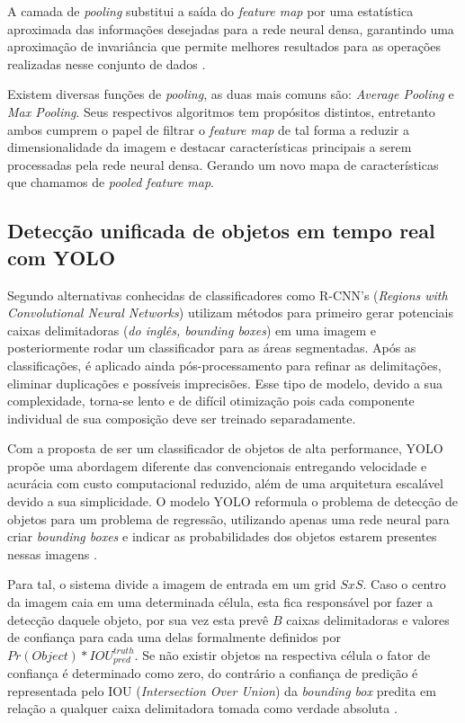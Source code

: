 \documentclass[12pt]{article}
\begin{document}
A camada de {\it pooling} substitui a saída do {\it feature map} por uma estatística aproximada das informações desejadas para a rede neural densa, garantindo uma aproximação de invariância que permite melhores resultados para as operações realizadas nesse conjunto de dados \cite{Goodfellow-et-al-2016}.

Existem diversas funções de {\it pooling}, as duas mais comuns são: {\it Average Pooling} e {\it Max Pooling}. Seus respectivos algoritmos tem propósitos distintos, entretanto ambos cumprem o papel de filtrar o {\it feature map} de tal forma a reduzir a dimensionalidade da imagem e destacar características principais a serem processadas pela rede neural densa. Gerando um novo mapa de características que chamamos de {\it pooled feature map}.

\subsection{Detecção unificada de objetos em tempo real com YOLO}

Segundo  alternativas conhecidas de classificadores como R-CNN's ({\it Regions with Convolutional Neural Networks}) utilizam métodos para primeiro gerar potenciais caixas delimitadoras ({\it do inglês, bounding boxes}) em uma imagem e posteriormente rodar um classificador para as áreas segmentadas. Após as classificações, é aplicado ainda pós-processamento para refinar as delimitações, eliminar duplicações e possíveis imprecisões. Esse tipo de modelo, devido a sua complexidade, torna-se lento e de difícil otimização pois cada componente individual de sua composição deve ser treinado separadamente.

Com a proposta de ser um classificador de objetos de alta performance, YOLO propõe uma abordagem diferente das convencionais entregando velocidade e acurácia com custo computacional reduzido, além de uma arquitetura escalável devido a sua simplicidade. O modelo YOLO reformula o problema de detecção de objetos para um problema de regressão, utilizando apenas uma rede neural para criar {\it bounding boxes} e indicar as probabilidades dos objetos estarem presentes nessas imagens \cite{Redmon2015}.

Para tal, o sistema divide a imagem de entrada em um grid $S x S$. Caso o centro da imagem caia em uma determinada célula, esta fica responsável por fazer a detecção daquele objeto, por sua vez esta prevê $B$ caixas delimitadoras e valores de confiança para cada uma delas formalmente definidos por $Pr(Object) * IOU^{truth}_{pred}$. Se não existir objetos na respectiva célula o fator de confiança é determinado como zero, do contrário a confiança de predição é representada pelo IOU ({\it Intersection Over Union}) da {\it bounding box} predita em relação a qualquer caixa delimitadora tomada como verdade absoluta \cite{Redmon2015}.
\end{document}
